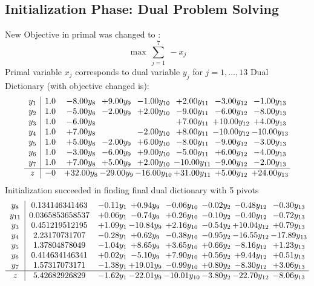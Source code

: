 \documentclass[9pt]{article}
\begin{document}
\subsection{Initialization Phase: Dual Problem Solving}
New Objective in primal was changed to : \[ \max\ \sum_{j=1}^{7}\ - x_j \] 
Primal variable $x_j$ corresponds to dual variable $y_j$ for $j = 1,\ldots,13$
Dual Dictionary (with objective changed is): 
\[\begin{array}{c| c c@{\hskip 2pt} c@{\hskip 2pt} c@{\hskip 2pt} c@{\hskip 2pt} c@{\hskip 2pt} c@{\hskip 2pt} }
 y_{1}   &  1.0 & -8.00 y_{8} & +  9.00 y_{9} & -1.00 y_{10} & +  2.00 y_{11} & -3.00 y_{12} & -1.00 y_{13}\\
 y_{2}   &  1.0 & -5.00 y_{8} & -2.00 y_{9} & +  2.00 y_{10} & -9.00 y_{11} & -6.00 y_{12} & -8.00 y_{13}\\
 y_{3}   &  1.0 & -6.00 y_{8} &    &   & +  7.00 y_{11} & + 10.00 y_{12} & +  4.00 y_{13}\\
 y_{4}   &  1.0 & +  7.00 y_{8} &   & -2.00 y_{10} & +  8.00 y_{11} & -10.00 y_{12} & -10.00 y_{13}\\
 y_{5}   &  1.0 & +  5.00 y_{8} & -2.00 y_{9} & +  6.00 y_{10} & -8.00 y_{11} & -9.00 y_{12} & -3.00 y_{13}\\
 y_{6}   &  1.0 & -3.00 y_{8} & -6.00 y_{9} & +  9.00 y_{10} & -5.00 y_{11} & +  6.00 y_{12} & -4.00 y_{13}\\
 y_{7}   &  1.0 & +  7.00 y_{8} & +  5.00 y_{9} & +  2.00 y_{10} & -10.00 y_{11} & -9.00 y_{12} & -2.00 y_{13}\\
\hline
z    &  -0 & + 32.00 y_{8} & -29.00 y_{9} & -16.00 y_{10} & + 31.00 y_{11} & +  5.00 y_{12} & + 24.00 y_{13}\\
\end{array}\]
Initialization succeeded in finding final dual dictionary with 5 pivots
\[\begin{array}{c| c c@{\hskip 2pt} c@{\hskip 2pt} c@{\hskip 2pt} c@{\hskip 2pt} c@{\hskip 2pt} c@{\hskip 2pt} }
 y_{8}   &  0.134146341463 & -0.11 y_{1} & +  0.94 y_{9} & -0.06 y_{10} & -0.02 y_{2} & -0.48 y_{12} & -0.30 y_{13}\\
 y_{11}   &  0.0365853658537 & +  0.06 y_{1} & -0.74 y_{9} & +  0.26 y_{10} & -0.10 y_{2} & -0.40 y_{12} & -0.72 y_{13}\\
 y_{3}   &  0.451219512195 & +  1.09 y_{1} & -10.84 y_{9} & +  2.16 y_{10} & -0.54 y_{2} & + 10.04 y_{12} & +  0.79 y_{13}\\
 y_{4}   &  2.23170731707 & -0.28 y_{1} & +  0.62 y_{9} & -0.38 y_{10} & -0.95 y_{2} & -16.55 y_{12} & -17.89 y_{13}\\
 y_{5}   &  1.37804878049 & -1.04 y_{1} & +  8.65 y_{9} & +  3.65 y_{10} & +  0.66 y_{2} & -8.16 y_{12} & +  1.23 y_{13}\\
 y_{6}   &  0.414634146341 & +  0.02 y_{1} & -5.10 y_{9} & +  7.90 y_{10} & +  0.56 y_{2} & +  9.44 y_{12} & +  0.51 y_{13}\\
 y_{7}   &  1.57317073171 & -1.38 y_{1} & + 19.01 y_{9} & -0.99 y_{10} & +  0.80 y_{2} & -8.30 y_{12} & +  3.06 y_{13}\\
\hline
z    &  5.42682926829 & -1.62 y_{1} & -22.01 y_{9} & -10.01 y_{10} & -3.80 y_{2} & -22.70 y_{12} & -8.06 y_{13}\\
\end{array}\]
\end{document}
